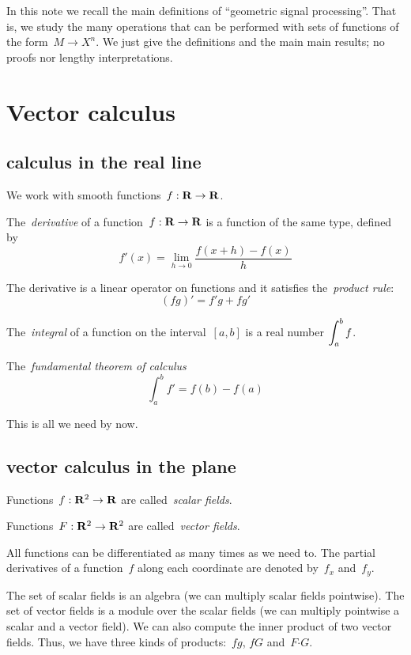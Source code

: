 In this note we recall the main definitions of ``geometric signal
processing''. That is, we study the many operations that can be performed with
sets of functions of the form~$M\to X^n$.  We just give the definitions and
the main main results; no proofs nor lengthy interpretations.


\clearpage
\section{Vector calculus}

\subsection{calculus in the real line}

We work with smooth functions~$f:\mathbf{R}\to\mathbf{R}$.

The~\emph{derivative} of a function~$f:\mathbf{R}\to\mathbf{R}$ is a function of the same
type, defined by
\[
	f'(x)=\lim_{h\to 0}\frac{f(x+h)-f(x)}h
\]


The derivative is a linear operator on functions and it satisfies
the~\emph{product rule}:
\[
	(fg)'=f'g+fg'
\]

The~\emph{integral} of a function on the interval~$[a,b]$ is a real number
$\displaystyle \int_a^bf$.

The~\emph{fundamental theorem of calculus}
\[
	\int_a^bf'=f(b)-f(a)
\]

This is all we need by now.


\subsection{vector calculus in the plane}

Functions~$f:\mathbf{R}^2\to\mathbf{R}$ are called~\emph{scalar fields}.

Functions~$F:\mathbf{R}^2\to\mathbf{R}^2$ are called~\emph{vector fields}.

All functions can be differentiated as many times as we need to.  The partial
derivatives of a function~$f$ along each coordinate are denoted by~$f_x$
and~$f_y$.

The set of scalar fields is an algebra (we can multiply scalar fields
pointwise).  The set of vector fields is a module over the scalar fields (we
can multiply pointwise a scalar and a vector field).  We can also compute the
inner product of two vector fields.  Thus, we have three kinds of
products:~$fg$, $fG$ and~$F\boldsymbol{\cdot}G$.

